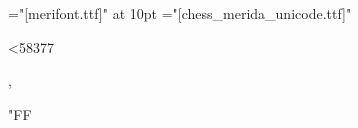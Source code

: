 \font\symchess="[merifont.ttf]" at 10pt
\font\arm="[chess_merida_unicode.ttf]"

\arm
\newcount\tar {}

\loop
  \advance{} 
  \leftline{{\rm\the\tar\ }\char\tar}
\ifnum\tar<58377\repeat

, 

\char"FF


\bye

